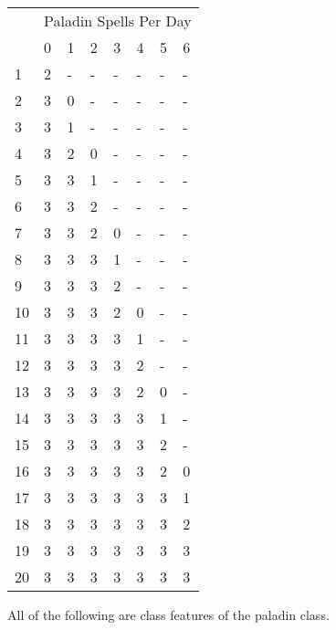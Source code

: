 \begin{small}
\noindent\begin{tabular}{llllllll} & \multicolumn{7}{l}{Paladin Spells Per Day}\\
   &0 &1 &2 &3 &4 &5 &6 \\
1  &2 &- &- &- &- &- &- \\
2  &3 &0 &- &- &- &- &- \\
3  &3 &1 &- &- &- &- &- \\
4  &3 &2 &0 &- &- &- &- \\
5  &3 &3 &1 &- &- &- &- \\
6  &3 &3 &2 &- &- &- &- \\
7  &3 &3 &2 &0 &- &- &- \\
8  &3 &3 &3 &1 &- &- &- \\
9  &3 &3 &3 &2 &- &- &- \\
10 &3 &3 &3 &2 &0 &- &- \\
11 &3 &3 &3 &3 &1 &- &- \\
12 &3 &3 &3 &3 &2 &- &- \\
13 &3 &3 &3 &3 &2 &0 &- \\
14 &3 &3 &3 &3 &3 &1 &- \\
15 &3 &3 &3 &3 &3 &2 &- \\
16 &3 &3 &3 &3 &3 &2 &0 \\
17 &3 &3 &3 &3 &3 &3 &1 \\
18 &3 &3 &3 &3 &3 &3 &2 \\
19 &3 &3 &3 &3 &3 &3 &3 \\
20 &3 &3 &3 &3 &3 &3 &3 \\
\end{tabular}
\end{small}

\smallskip \noindent All of the following are class features of the paladin class.



